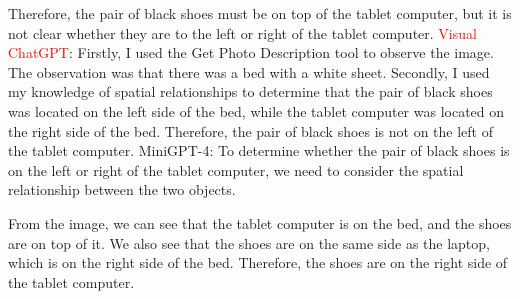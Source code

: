 \begin{enumerate}
    Therefore, the pair of black shoes must be on top of the tablet computer, but it is not clear whether they are to the left or right of the tablet computer.
    \subitem \textcolor{red}{Visual ChatGPT}: Firstly, I used the Get Photo Description tool to observe the image. The observation was that there was a bed with a white sheet. Secondly, I used my knowledge of spatial relationships to determine that the pair of black shoes was located on the left side of the bed, while the tablet computer was located on the right side of the bed. Therefore, the pair of black shoes is not on the left of the tablet computer.
    \subitem MiniGPT-4: To determine whether the pair of black shoes is on the left or right of the tablet computer, we need to consider the spatial relationship between the two objects.

    From the image, we can see that the tablet computer is on the bed, and the shoes are on top of it. We also see that the shoes are on the same side as the laptop, which is on the right side of the bed. Therefore, the shoes are on the right side of the tablet computer.
\end{enumerate}
